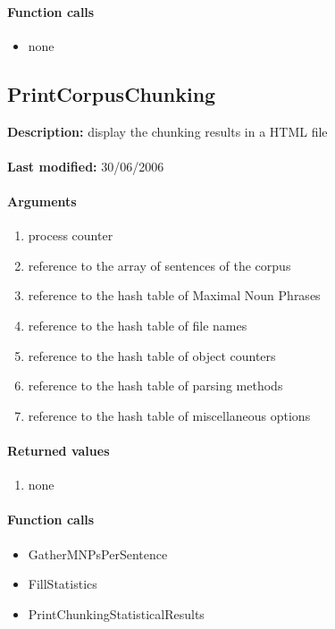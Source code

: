 \paragraph{Function calls}
\begin{itemize}
\item none
\end{itemize}

\subsection{PrintCorpusChunking}
\textbf{Description:} display the chunking results in a HTML file\\
\\\textbf{Last modified:} 30/06/2006

\paragraph{Arguments}
\begin{enumerate}
\item process counter
\item reference to the array of sentences of the corpus
\item reference to the hash table of Maximal Noun Phrases
\item reference to the hash table of file names
\item reference to the hash table of object counters
\item reference to the hash table of parsing methods
\item reference to the hash table of miscellaneous options
\end{enumerate}

\paragraph{Returned values}
\begin{enumerate}
\item none
\end{enumerate}

\paragraph{Function calls}
\begin{itemize}
\item GatherMNPsPerSentence
\item FillStatistics
\item PrintChunkingStatisticalResults
\end{itemize}

